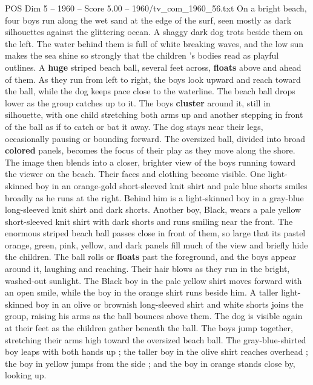 \begin{textsample}{POS Dim 5 – 1960 – Score 5.00 – 1960/tv\_com\_1960\_56.txt}  \label{ex:f5_pos_058}
On a bright beach, four boys run along the wet sand at the edge of the surf, seen mostly as dark silhouettes against the glittering ocean.
A shaggy dark dog trots beside them on the left.
The water behind them is full of white breaking waves, and the low sun makes the sea shine so strongly that the children ’s bodies read as playful outlines.
A \textbf{huge} striped beach ball, several feet across, \textbf{floats} above and ahead of them.
As they run from left to right, the boys look upward and reach toward the ball, while the dog keeps pace close to the waterline.
The beach ball drops lower as the group catches up to it.
The boys \textbf{cluster} around it, still in silhouette, with one child stretching both arms up and another stepping in front of the ball as if to catch or bat it away.
The dog stays near their legs, occasionally pausing or bounding forward.
The oversized ball, divided into broad \textbf{colored} panels, becomes the focus of their play as they move along the shore.
The image then blends into a closer, brighter view of the boys running toward the viewer on the beach.
Their faces and clothing become visible.
One light-skinned boy in an orange-gold short-sleeved knit shirt and pale blue shorts smiles broadly as he runs at the right.
Behind him is a light-skinned boy in a gray-blue long-sleeved knit shirt and dark shorts.
Another boy, Black, wears a pale yellow short-sleeved knit shirt with dark shorts and runs smiling near the front.
The enormous striped beach ball passes close in front of them, so large that its pastel orange, green, pink, yellow, and dark panels fill much of the view and briefly hide the children.
The ball rolls or \textbf{floats} past the foreground, and the boys appear around it, laughing and reaching.
Their hair blows as they run in the bright, washed-out sunlight.
The Black boy in the pale yellow shirt moves forward with an open smile, while the boy in the orange shirt runs beside him.
A taller light-skinned boy in an olive or brownish long-sleeved shirt and white shorts joins the group, raising his arms as the ball bounces above them.
The dog is visible again at their feet as the children gather beneath the ball.
The boys jump together, stretching their arms high toward the oversized beach ball.
The gray-blue-shirted boy leaps with both hands up ; the taller boy in the olive shirt reaches overhead ; the boy in yellow jumps from the side ; and the boy in orange stands close by, looking up.

\end{textsample}

